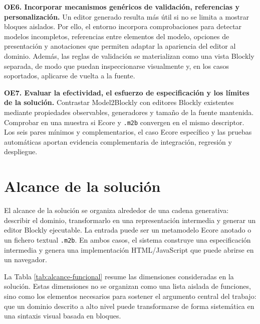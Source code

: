 \medskip
\noindent\textbf{OE6. Incorporar mecanismos genéricos de validación, referencias
y personalización.} Un editor generado resulta más útil si no se limita a
mostrar bloques aislados. Por ello, el entorno incorpora comprobaciones para
detectar modelos incompletos, referencias entre elementos del modelo, opciones
de presentación y anotaciones que permiten adaptar la apariencia del editor al
dominio. Además, las reglas de validación se materializan como una vista Blockly
separada, de modo que puedan inspeccionarse visualmente y, en los casos
soportados, aplicarse de vuelta a la fuente.

\medskip
\noindent\textbf{OE7. Evaluar la efectividad, el esfuerzo de especificación y
los límites de la solución.} Contrastar Model2Blockly con editores Blockly
existentes mediante propiedades observables, generadores y tamaño de la fuente
mantenida. Comprobar en una muestra si Ecore y \texttt{.m2b} convergen en el
mismo descriptor. Los seis pares mínimos y complementarios, el caso Ecore
específico y las pruebas automáticas aportan evidencia complementaria de
integración, regresión y despliegue.

\section{Alcance de la solución}
\label{sec:alcance-funcional}

El alcance de la solución se organiza alrededor de una cadena generativa:
describir el dominio, transformarlo en una representación intermedia y generar
un editor Blockly ejecutable. La entrada puede ser un metamodelo Ecore anotado o
un fichero textual \texttt{.m2b}. En ambos casos, el sistema construye una
especificación intermedia y genera una implementación
HTML/JavaScript que puede abrirse en un navegador.

La Tabla \ref{tab:alcance-funcional} resume las dimensiones consideradas en la
solución. Estas dimensiones no se organizan como una lista aislada de funciones,
sino como los elementos necesarios para sostener el argumento central del
trabajo: que un dominio descrito a alto nivel puede transformarse de forma
sistemática en una sintaxis visual basada en bloques.

